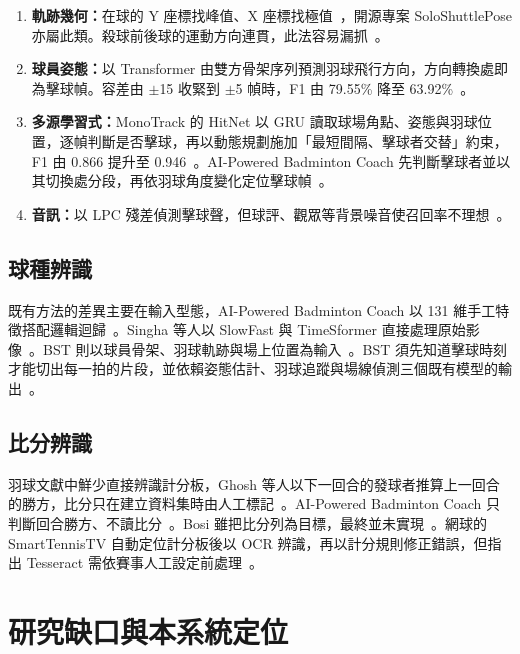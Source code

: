 \begin{enumerate}
  \item \textbf{軌跡幾何：}在球的 Y 座標找峰值、X 座標找極值~\cite{bosi2021thesis}，開源專案 SoloShuttlePose \cite{soloshuttlepose} 亦屬此類。殺球前後球的運動方向連貫，此法容易漏抓~\cite{bosi2021thesis}。
  \item \textbf{球員姿態：}以 Transformer 由雙方骨架序列預測羽球飛行方向，方向轉換處即為擊球幀。容差由 $\pm$15 收緊到 $\pm$5 幀時，F1 由 79.55\% 降至 63.92\%~\cite{chien2023hitframe}。
  \item \textbf{多源學習式：}MonoTrack 的 HitNet 以 GRU 讀取球場角點、姿態與羽球位置，逐幀判斷是否擊球，再以動態規劃施加「最短間隔、擊球者交替」約束，F1 由 0.866 提升至 0.946~\cite{monotrack}。AI-Powered Badminton Coach 先判斷擊球者並以其切換處分段，再依羽球角度變化定位擊球幀~\cite{guo2025coach}。
  \item \textbf{音訊：}以 LPC 殘差偵測擊球聲，但球評、觀眾等背景噪音使召回率不理想~\cite{bosi2021thesis}。
\end{enumerate}

\subsection{球種辨識}

既有方法的差異主要在輸入型態，AI-Powered Badminton Coach 以 131 維手工特徵搭配邏輯迴歸~\cite{guo2025coach}。Singha 等人以 SlowFast 與 TimeSformer 直接處理原始影像~\cite{singha2025hybrid}。BST 則以球員骨架、羽球軌跡與場上位置為輸入~\cite{bst}。BST 須先知道擊球時刻才能切出每一拍的片段，並依賴姿態估計、羽球追蹤與場線偵測三個既有模型的輸出~\cite{bst}。

\subsection{比分辨識}

羽球文獻中鮮少直接辨識計分板，Ghosh 等人以下一回合的發球者推算上一回合的勝方，比分只在建立資料集時由人工標記~\cite{ghosh2018structured}。AI-Powered Badminton Coach 只判斷回合勝方、不讀比分~\cite{guo2025coach}。Bosi 雖把比分列為目標，最終並未實現~\cite{bosi2021thesis}。網球的 SmartTennisTV 自動定位計分板後以 OCR 辨識，再以計分規則修正錯誤，但指出 Tesseract 需依賽事人工設定前處理~\cite{smarttennistv}。

\section{研究缺口與本系統定位}
\label{sec:research-gap}

